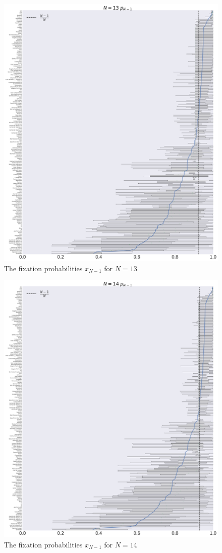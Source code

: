 \documentclass[10pt,letterpaper]{article}
\begin{document}
\begin{figure}[!hbtp]
    \centering
    \includegraphics[width=\textwidth]{./boxplot_13_resist.pdf}
    \caption{The fixation probabilities \(x_{N-1}\) for \(N=13\)}
\end{figure}

\begin{figure}[!hbtp]
    \centering
    \includegraphics[width=\textwidth]{./boxplot_14_resist.pdf}
    \caption{The fixation probabilities \(x_{N-1}\) for \(N=14\)}
    \label{resistance-14}
\end{figure}
\end{document}
